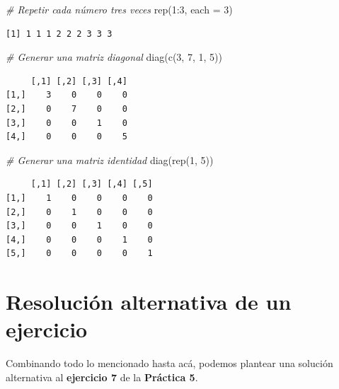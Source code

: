 \documentclass[
]{book}
\newenvironment{Shaded}{\begin{snugshade}}{\end{snugshade}}
\newcommand{\AttributeTok}[1]{\textcolor[rgb]{0.77,0.63,0.00}{#1}}
\newcommand{\CommentTok}[1]{\textcolor[rgb]{0.56,0.35,0.01}{\textit{#1}}}
\newcommand{\DecValTok}[1]{\textcolor[rgb]{0.00,0.00,0.81}{#1}}
\newcommand{\FunctionTok}[1]{\textcolor[rgb]{0.00,0.00,0.00}{#1}}
\newcommand{\NormalTok}[1]{#1}
\newcommand{\SpecialCharTok}[1]{\textcolor[rgb]{0.00,0.00,0.00}{#1}}
\begin{document}
\begin{Shaded}
\begin{Highlighting}[]
\CommentTok{\# Repetir cada número tres veces}
\FunctionTok{rep}\NormalTok{(}\DecValTok{1}\SpecialCharTok{:}\DecValTok{3}\NormalTok{, }\AttributeTok{each =} \DecValTok{3}\NormalTok{)}
\end{Highlighting}
\end{Shaded}

\begin{verbatim}
[1] 1 1 1 2 2 2 3 3 3
\end{verbatim}

\begin{Shaded}
\begin{Highlighting}[]
\CommentTok{\# Generar una matriz diagonal}
\FunctionTok{diag}\NormalTok{(}\FunctionTok{c}\NormalTok{(}\DecValTok{3}\NormalTok{, }\DecValTok{7}\NormalTok{, }\DecValTok{1}\NormalTok{, }\DecValTok{5}\NormalTok{))}
\end{Highlighting}
\end{Shaded}

\begin{verbatim}
     [,1] [,2] [,3] [,4]
[1,]    3    0    0    0
[2,]    0    7    0    0
[3,]    0    0    1    0
[4,]    0    0    0    5
\end{verbatim}

\begin{Shaded}
\begin{Highlighting}[]
\CommentTok{\# Generar una matriz identidad}
\FunctionTok{diag}\NormalTok{(}\FunctionTok{rep}\NormalTok{(}\DecValTok{1}\NormalTok{, }\DecValTok{5}\NormalTok{))}
\end{Highlighting}
\end{Shaded}

\begin{verbatim}
     [,1] [,2] [,3] [,4] [,5]
[1,]    1    0    0    0    0
[2,]    0    1    0    0    0
[3,]    0    0    1    0    0
[4,]    0    0    0    1    0
[5,]    0    0    0    0    1
\end{verbatim}

\hypertarget{resoluciuxf3n-alternativa-de-un-ejercicio}{%
\section{Resolución alternativa de un ejercicio}\label{resoluciuxf3n-alternativa-de-un-ejercicio}}

Combinando todo lo mencionado hasta acá, podemos plantear una solución alternativa al \textbf{ejercicio 7} de la \textbf{Práctica 5}.
\end{document}

